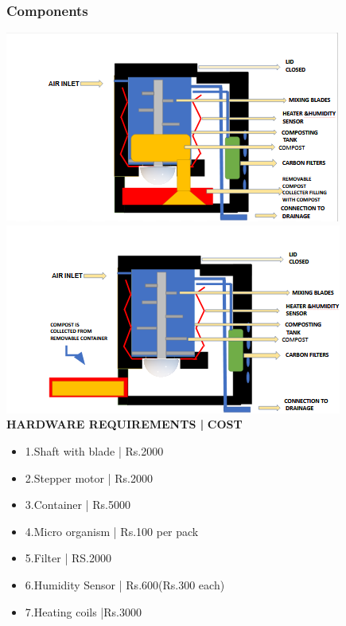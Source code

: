 \documentclass[11pt]{beamer}
\begin{document}
\begin{frame}
	\frametitle{Components}
	 \includegraphics[height=0.35\textheight]{image2.png}
	 \includegraphics[height=0.35\textheight]{image3.png}
	\\ \textbf{HARDWARE REQUIREMENTS |}
	\textbf{COST}
	\begin{itemize}
		\item1.Shaft with blade | Rs.2000
		\item2.Stepper motor | Rs.2000
		\item3.Container | Rs.5000
		\item4.Micro organism | Rs.100 per pack
		\item5.Filter | RS.2000

		\item6.Humidity Sensor | Rs.600(Rs.300 each)
		\item7.Heating coils |Rs.3000
	\end{itemize}
\end{frame}
\end{document}
